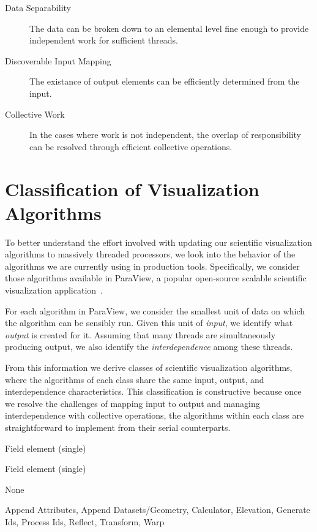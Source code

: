 \documentclass{sig-alternate}
\newcommand*{\lcite}[1]{~\cite{#1}}
\newcommand*{\keyterm}[1]{\emph{#1}}
\newcommand{\algclass}[1]{\textsf{#1}}
\newcommand{\algorithmclasssection}[1]{
  \vspace{\baselineskip}\noindent{\large\textbf{\algclass{#1}}}}
\newcommand{\algorithmclass}[5]{
  \algorithmclasssection{#1} %
  \vspace{-.4\baselineskip}
  \begin{description}[leftmargin=9em,style=nextline,noitemsep]
    \raggedright
  \item[Input] #2
  \item[Output] #3
  \item[Interdependence] #4
  \item[Algorithms] #5
  \end{description}
}
\begin{document}
\begin{description}
\item[Data Separability] The data can be broken down to an elemental level
  fine enough to provide independent work for sufficient threads.
\item[Discoverable Input Mapping] The existance of output elements can be
  efficiently determined from the input.
\item[Collective Work] In the cases where work is not independent, the
  overlap of responsibility can be resolved through efficient collective
  operations.
\end{description}


\section{Classification of Visualization Algorithms}
\label{sec:Classification}

\noindent
To better understand the effort involved with updating our scientific
visualization algorithms to massively threaded processors, we look into the
behavior of the algorithms we are currently using in production
tools. Specifically, we consider those algorithms available in ParaView, a
popular open-source scalable scientific visualization
application\lcite{ParaView}.

For each algorithm in ParaView, we consider the smallest unit of data on
which the algorithm can be sensibly run. Given this unit of
\keyterm{input}, we identify what \keyterm{output} is created for
it. Assuming that many threads are simultaneously producing output, we also
identify the \keyterm{interdependence} among these threads.

From this information we derive classes of scientific visualization
algorithms, where the algorithms of each class share the same input,
output, and interdependence characteristics. This classification is
constructive because once we resolve the challenges of mapping input to
output and managing interdependence with collective operations, the
algorithms within each class are straightforward to implement from their
serial counterparts.

\algorithmclass{Basic Mapping}
               {Field element (single)} %
               {Field element (single)} %
               {None} %
               {Append Attributes, Append Datasets/Geometry, Calculator,
                 Elevation, Generate Ids, Process Ids, Reflect, Transform,
                 Warp}
\end{document}
